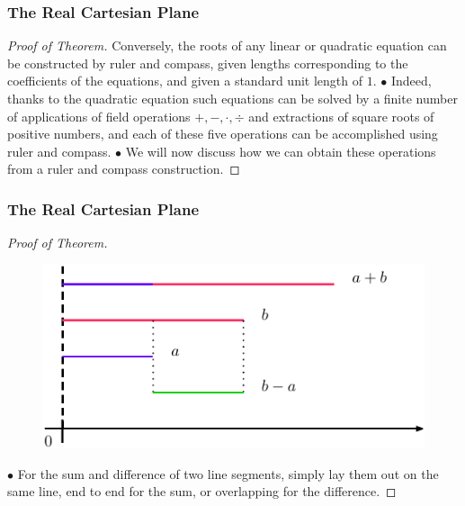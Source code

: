 \documentclass[compress,mathserif,serif]{beamer}
\begin{document}
\begin{frame}
\frametitle{The Real Cartesian Plane}
\begin{proof}[Proof of Theorem]\let\qed\relax
Conversely, the roots of any linear or quadratic equation can be constructed by ruler and compass, given lengths corresponding to the coefficients of the equations, and given a standard unit length of $1$.
\pause
\newline
\newline
$\bullet$ Indeed, thanks to the quadratic equation such equations can be solved by a finite number of applications of field operations $+,-, \cdot, \div$ and extractions of square roots of positive numbers, and each of these five operations can be accomplished using ruler and compass.
\pause
\newline
\newline
$\bullet$ We will now discuss how we can obtain these operations from a ruler and compass construction. 
\end{proof}
\end{frame}


\begin{frame}
\frametitle{The Real Cartesian Plane}
\begin{proof}[Proof of Theorem]\let\qed\relax
\begin{figure}[hbtp]
\centering
\includegraphics[scale=1]{addsub.pdf}
\end{figure}
$\bullet$ For the sum and difference of two line segments, simply lay them out on the same line, end to end for the sum, or overlapping for the difference.
\end{proof}
\end{frame}
\end{document}
